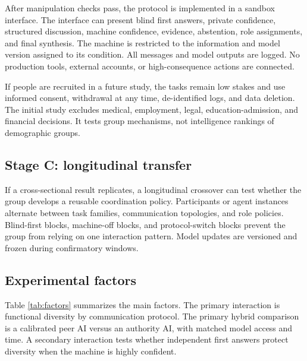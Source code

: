 \documentclass[conference]{IEEEtran}
\begin{document}
After manipulation checks pass, the protocol is implemented in a sandbox interface. The interface can present blind first answers, private confidence, structured discussion, machine confidence, evidence, abstention, role assignments, and final synthesis. The machine is restricted to the information and model version assigned to its condition. All messages and model outputs are logged. No production tools, external accounts, or high-consequence actions are connected.

If people are recruited in a future study, the tasks remain low stakes and use informed consent, withdrawal at any time, de-identified logs, and data deletion. The initial study excludes medical, employment, legal, education-admission, and financial decisions. It tests group mechanisms, not intelligence rankings of demographic groups.

\subsection{Stage C: longitudinal transfer}

If a cross-sectional result replicates, a longitudinal crossover can test whether the group develops a reusable coordination policy. Participants or agent instances alternate between task families, communication topologies, and role policies. Blind-first blocks, machine-off blocks, and protocol-switch blocks prevent the group from relying on one interaction pattern. Model updates are versioned and frozen during confirmatory windows.

\subsection{Experimental factors}

Table \ref{tab:factors} summarizes the main factors. The primary interaction is functional diversity by communication protocol. The primary hybrid comparison is a calibrated peer AI versus an authority AI, with matched model access and time. A secondary interaction tests whether independent first answers protect diversity when the machine is highly confident.
\end{document}
